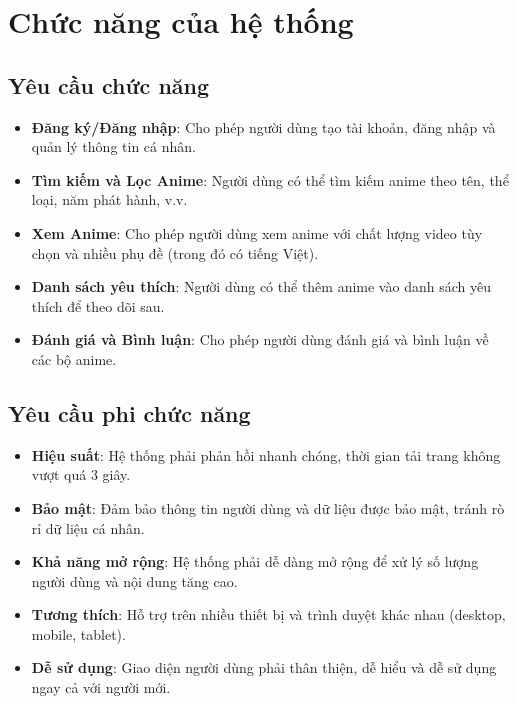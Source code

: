 \section{Chức năng của hệ thống}
\subsection{Yêu cầu chức năng}
\begin{itemize}
    \item \textbf{Đăng ký/Đăng nhập}: Cho phép người dùng tạo tài khoản, đăng nhập và quản lý thông tin cá nhân.
    \item \textbf{Tìm kiếm và Lọc Anime}: Người dùng có thể tìm kiếm anime theo tên, thể loại, năm phát hành, v.v.
    \item \textbf{Xem Anime}: Cho phép người dùng xem anime với chất lượng video tùy chọn và nhiều phụ đề (trong đó có tiếng Việt).
    \item \textbf{Danh sách yêu thích}: Người dùng có thể thêm anime vào danh sách yêu thích để theo dõi sau.
    \item \textbf{Đánh giá và Bình luận}: Cho phép người dùng đánh giá và bình luận về các bộ anime.
\end{itemize}
\subsection{Yêu cầu phi chức năng}
\begin{itemize}
    \item \textbf{Hiệu suất}: Hệ thống phải phản hồi nhanh chóng, thời gian tải trang không vượt quá 3 giây.
    \item \textbf{Bảo mật}: Đảm bảo thông tin người dùng và dữ liệu được bảo mật, tránh rò rỉ dữ liệu cá nhân.
    \item \textbf{Khả năng mở rộng}: Hệ thống phải dễ dàng mở rộng để xử lý số lượng người dùng và nội dung tăng cao.
    \item \textbf{Tương thích}: Hỗ trợ trên nhiều thiết bị và trình duyệt khác nhau (desktop, mobile, tablet).
    \item \textbf{Dễ sử dụng}: Giao diện người dùng phải thân thiện, dễ hiểu và dễ sử dụng ngay cả với người mới.
\end{itemize}
\pagebreak

